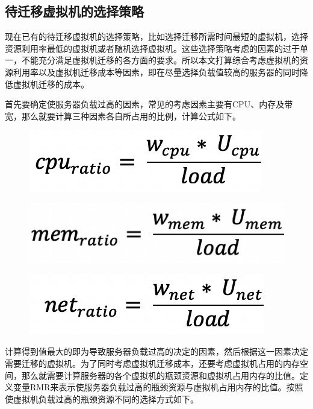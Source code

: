 \subsection{待迁移虚拟机的选择策略}
现在已有的待迁移虚拟机的选择策略，比如选择迁移所需时间最短的虚拟机，选择资源利用率最低的虚拟机或者随机选择虚拟机。这些选择策略考虑的因素的过于单一，不能充分满足虚拟机迁移的各方面的要求。所以本文打算综合考虑虚拟机的资源利用率以及虚拟机迁移成本等因素，即在尽量选择负载值较高的服务器的同时降低虚拟机迁移的成本。

首先要确定使服务器负载过高的因素，常见的考虑因素主要有CPU、内存及带宽，那么就要计算三种因素各自所占用的比例，计算公式如下。

 \begin{figure}[htb]
  \centering
  \includegraphics[width=0.3\linewidth]{./Figure/IMG_Chap3_9.png}
\end{figure}

 \begin{figure}[htb]
  \centering
  \includegraphics[width=0.3\linewidth]{./Figure/IMG_Chap3_10.png}
\end{figure}

 \begin{figure}[htb]
  \centering
  \includegraphics[width=0.3\linewidth]{./Figure/IMG_Chap3_11.png}
\end{figure}

计算得到值最大的即为导致服务器负载过高的决定的因素，然后根据这一因素决定需要迁移的虚拟机。为了同时考虑虚拟机迁移成本，还要考虑虚拟机占用的内存空间，那么就需要计算服务器的各个虚拟机的瓶颈资源和虚拟机占用内存的比值。定义变量RMR来表示使服务器负载过高的瓶颈资源与虚拟机占用内存的比值。按照使虚拟机负载过高的瓶颈资源不同的选择方式如下。

